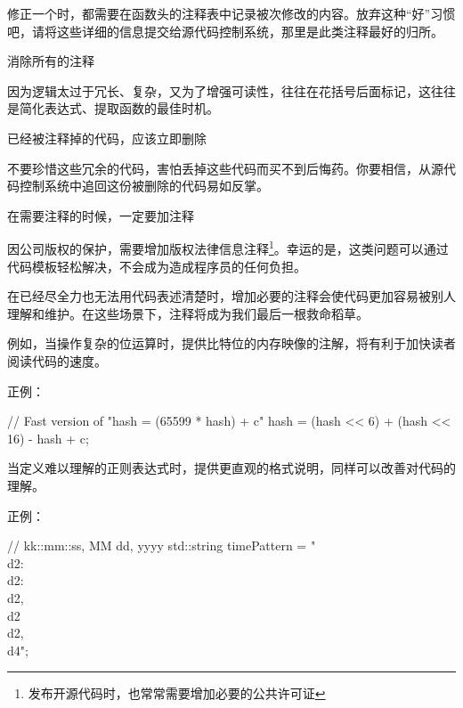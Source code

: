 \begin{content}
修正一个时，都需要在函数头的注释表中记录被次修改的内容。放弃这种“好”习惯吧，请将这些详细的信息提交给源代码控制系统，那里是此类注释最好的归所。

\begin{regulation}
消除所有的注释
\end{regulation}

因为逻辑太过于冗长、复杂，又为了增强可读性，往往在花括号后面标记，这往往是简化表达式、提取函数的最佳时机。

\begin{regulation}
已经被注释掉的代码，应该立即删除
\end{regulation}

不要珍惜这些冗余的代码，害怕丢掉这些代码而买不到后悔药。你要相信，从源代码控制系统中追回这份被删除的代码易如反掌。

\begin{regulation}
在需要注释的时候，一定要加注释
\end{regulation}

因公司版权的保护，需要增加版权法律信息注释\footnote{发布开源代码时，也常常需要增加必要的公共许可证}。幸运的是，这类问题可以通过代码模板轻松解决，不会成为造成程序员的任何负担。

在已经尽全力也无法用代码表述清楚时，增加必要的注释会使代码更加容易被别人理解和维护。在这些场景下，注释将成为我们最后一根救命稻草。

\begin{enum}
\end{enum}

例如，当操作复杂的位运算时，提供比特位的内存映像的注解，将有利于加快读者阅读代码的速度。

正例：
\begin{leftbar}
\begin{c++}
// Fast version of "hash = (65599 * hash) + c"
hash = (hash << 6) + (hash << 16) - hash + c;
\end{c++}
\end{leftbar}

当定义难以理解的正则表达式时，提供更直观的格式说明，同样可以改善对代码的理解。

正例：
\begin{leftbar}
\begin{c++}
// kk::mm::ss, MM dd, yyyy
std::string timePattern = "\\d{2}:\\d{2}:\\d{2}, \\d{2} \\d{2}, \\d{4}";
\end{c++}
\end{leftbar}

\end{content}

